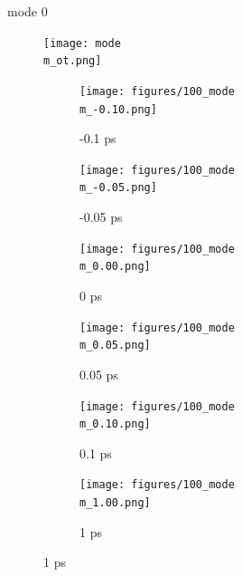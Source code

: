 \documentclass{beamer}
\newcommand\w{0.32}
\begin{document}

\newcommand\m{0}
\newcommand{\molwidth}{0.1}
\newcommand{\vh}{-10}

\iftrue

\begin{frame}{mode \m}
	\vspace{\vh mm}
	\begin{figure}
		\centering
		\texttt{[image: mode\\m\_ot.png]}
	\end{figure}
	\begin{figure}
		\centering
		\begin{subfigure}[b]{\w\textwidth}
			\centering
			\texttt{[image: figures/100\_mode\\m\_-0.10.png]}
			\caption{-0.1 ps}
			\label{fig:}
		\end{subfigure}
		\begin{subfigure}[b]{\w\textwidth}
			\centering
			\texttt{[image: figures/100\_mode\\m\_-0.05.png]}
			\caption{-0.05 ps}
			\label{fig:}
		\end{subfigure}
		\begin{subfigure}[b]{\w\textwidth}
			\centering
			\texttt{[image: figures/100\_mode\\m\_0.00.png]}
			\caption{0 ps}
			\label{fig:}
		\end{subfigure}
		\begin{subfigure}[b]{\w\textwidth}
			\centering
			\texttt{[image: figures/100\_mode\\m\_0.05.png]}
			\caption{0.05 ps}
			\label{fig:}
		\end{subfigure}
		\begin{subfigure}[b]{\w\textwidth}
			\centering
			\texttt{[image: figures/100\_mode\\m\_0.10.png]}
			\caption{0.1 ps}
			\label{fig:}
		\end{subfigure}
		\begin{subfigure}[b]{\w\textwidth}
			\centering
			\texttt{[image: figures/100\_mode\\m\_1.00.png]}
			\caption{1 ps}
			\label{fig:}
		\end{subfigure}
	\end{figure}
\end{frame}
\end{document}
